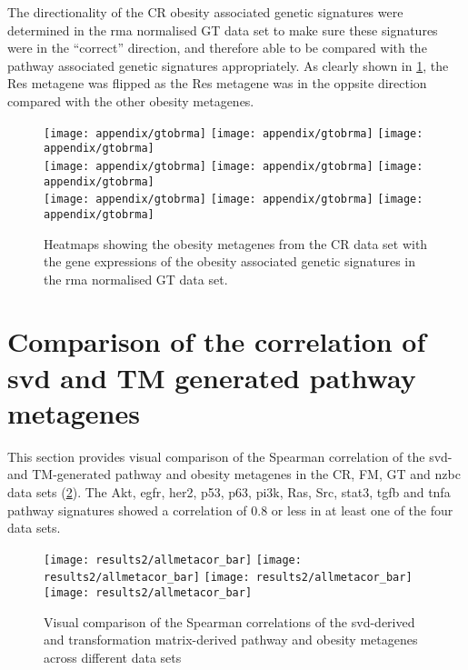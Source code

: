 	The directionality of the CR obesity associated genetic signatures were determined in the \gls{rma} normalised GT data set to make sure these signatures were in the ``correct'' direction, and therefore able to be compared with the pathway associated genetic signatures appropriately.
	As clearly shown in \cref{fig:appendix/ob_meta_dir_gt}, the Res metagene was flipped as the Res metagene was in the oppsite direction compared with the other obesity metagenes.

	\begin{figure}[htp!]
		\centering
		\texttt{[image: appendix/gtobrma]}
		\texttt{[image: appendix/gtobrma]}
		\texttt{[image: appendix/gtobrma]}\\
		\texttt{[image: appendix/gtobrma]}
		\texttt{[image: appendix/gtobrma]}
		\texttt{[image: appendix/gtobrma]}\\
		\texttt{[image: appendix/gtobrma]}
		\texttt{[image: appendix/gtobrma]}
		\texttt{[image: appendix/gtobrma]}\\
		\caption[]{Heatmaps showing the obesity metagenes from the CR data set with the gene expressions of the obesity associated genetic signatures in the \gls{rma} normalised GT data set.
		}
		\label{fig:appendix/ob_meta_dir_gt}
	\end{figure}

	\newpage

	\section{Comparison of the correlation of \gls{svd} and TM generated pathway metagenes}
	\label{sec:comparison_of_the_correlation_of_svd_and_tm_generated_pathway_metagenes}

	This section provides visual comparison of the Spearman correlation of the \gls{svd}- and TM-generated pathway and obesity metagenes in the CR, FM, GT and \gls{nzbc} data sets (\cref{fig:allmetacor_bar_appendix}).
	The Akt, \gls{egfr}, \gls{her2}, p53, p63, \gls{pi3k}, Ras, Src, \gls{stat3}, \gls{tgfb} and \gls{tnfa} pathway signatures showed a correlation of 0.8 or less in at least one of the four data sets.

	\begin{figure}[htpb]
		\centering
		\texttt{[image: results2/allmetacor\_bar]}
		\texttt{[image: results2/allmetacor\_bar]}
		\texttt{[image: results2/allmetacor\_bar]}
		\texttt{[image: results2/allmetacor\_bar]}\\
		\caption[]{Visual comparison of the Spearman correlations of the \gls{svd}-derived and transformation matrix-derived pathway and obesity metagenes across different data sets}
		\label{fig:allmetacor_bar_appendix}
	\end{figure}

